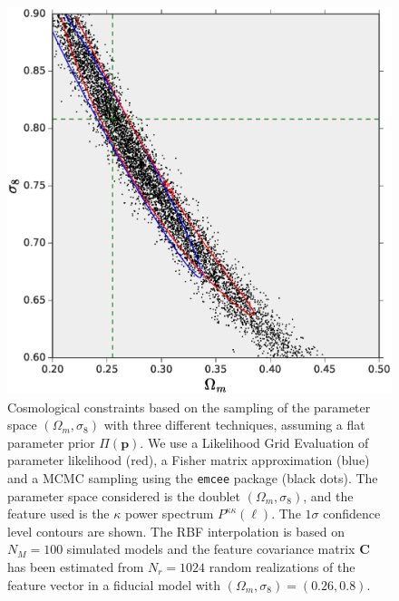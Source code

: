 \documentclass[reprint,aps,prd,superscriptaddress,showkeys,showpacs]{revtex4-1}
\newcommand{\bb}[1]{\mathbf{#1}}
\newcommand{\ttt}[1]{\texttt{#1}}
\begin{document}
\begin{figure}
\includegraphics[scale=0.4]{Figures/parameter_sampling.eps}
\caption{Cosmological constraints based on the sampling of the parameter space $(\Omega_m,\sigma_8)$ with three different techniques, assuming a flat parameter prior $\Pi(\bb{p})$. We use a Likelihood Grid Evaluation of parameter likelihood (red), a Fisher matrix approximation (blue) and a MCMC sampling using the \ttt{emcee} package (black dots). The parameter space considered is the doublet $(\Omega_m,\sigma_8)$, and the feature used is the $\kappa$ power spectrum $P^{\kappa\kappa}(\ell)$. The $1\sigma$ confidence level contours are shown. The RBF interpolation is based on $N_M=100$ simulated models and the feature covariance matrix $\bb{C}$ has been estimated from $N_r=1024$ random realizations of the feature vector in a fiducial model with $(\Omega_m,\sigma_8)=(0.26,0.8)$.}
\label{samplingfig}
\end{figure}

\end{document}
